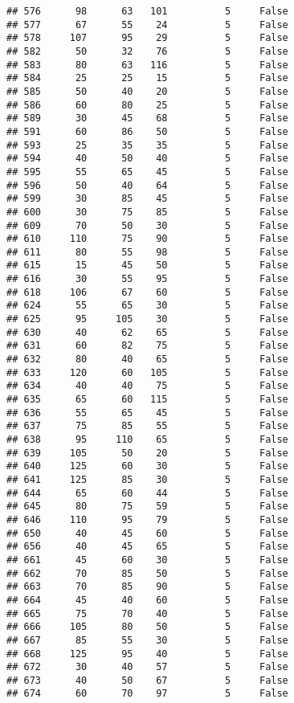 \documentclass[
]{article}
\begin{document}
\begin{verbatim}
## 576      98      63   101          5     False
## 577      67      55    24          5     False
## 578     107      95    29          5     False
## 582      50      32    76          5     False
## 583      80      63   116          5     False
## 584      25      25    15          5     False
## 585      50      40    20          5     False
## 586      60      80    25          5     False
## 589      30      45    68          5     False
## 591      60      86    50          5     False
## 593      25      35    35          5     False
## 594      40      50    40          5     False
## 595      55      65    45          5     False
## 596      50      40    64          5     False
## 599      30      85    45          5     False
## 600      30      75    85          5     False
## 609      70      50    30          5     False
## 610     110      75    90          5     False
## 611      80      55    98          5     False
## 615      15      45    50          5     False
## 616      30      55    95          5     False
## 618     106      67    60          5     False
## 624      55      65    30          5     False
## 625      95     105    30          5     False
## 630      40      62    65          5     False
## 631      60      82    75          5     False
## 632      80      40    65          5     False
## 633     120      60   105          5     False
## 634      40      40    75          5     False
## 635      65      60   115          5     False
## 636      55      65    45          5     False
## 637      75      85    55          5     False
## 638      95     110    65          5     False
## 639     105      50    20          5     False
## 640     125      60    30          5     False
## 641     125      85    30          5     False
## 644      65      60    44          5     False
## 645      80      75    59          5     False
## 646     110      95    79          5     False
## 650      40      45    60          5     False
## 656      40      45    65          5     False
## 661      45      60    30          5     False
## 662      70      85    50          5     False
## 663      70      85    90          5     False
## 664      45      40    60          5     False
## 665      75      70    40          5     False
## 666     105      80    50          5     False
## 667      85      55    30          5     False
## 668     125      95    40          5     False
## 672      30      40    57          5     False
## 673      40      50    67          5     False
## 674      60      70    97          5     False

\end{verbatim}
\end{document}
